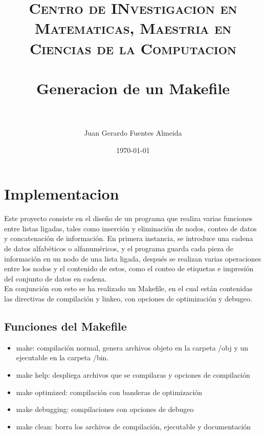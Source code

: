 \documentclass[paper=a4, fontsize=11pt]{scrartcl} %
\title{	
\normalfont \normalsize 
\textsc{Centro de INvestigacion en Matematicas, Maestria en Ciencias de la Computacion} \\ [25pt] %
\horrule{0.5pt} \\[0.4cm] %
\huge Generacion de un Makefile \\ %
\horrule{2pt} \\[0.5cm] %
}
\author{Juan Gerardo Fuentes Almeida} %
\date{\normalsize\today} %
\begin{document}
\maketitle %


\section{Implementacion}

Este proyecto consiste en el diseño de un programa que realiza varias funciones entre listas ligadas, tales como inserción y eliminación de nodos, conteo de datos y concatenación de información. En primera instancia, se introduce una cadena de datos alfabéticos o alfanuméricos, y el programa guarda cada pieza de información en un nodo de una lista ligada, después se realizan varias operaciones entre los nodos y el contenido de estos, como el conteo de etiquetas e impresión del conjunto de datos en cadena.\\

En conjunción con esto se ha realizado un Makefile, en el cual están contenidas las directivas de compilación y linkeo, con opciones de optimización y debugeo.\\


\subsection{Funciones del Makefile}
\begin{itemize}
	\item make: compilación normal, genera archivos objeto en la carpeta /obj y un ejecutable en la carpeta /bin.
	\item make help: despliega archivos que se compilaras y opciones de compilación
	\item make optimized: compilación con banderas de optimización
	\item make debugging: compilaciones con opciones de debugeo
	\item make clean: borra los archivos de compilación, ejecutable y documentación
	
\end{itemize}

\end{document}
